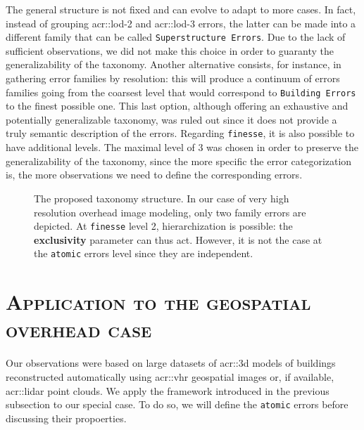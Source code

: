         The general structure is not fixed and can evolve to adapt to more cases.
        In fact, instead of grouping \gls{acr::lod}-2 and \gls{acr::lod}-3 errors, the latter can be made into a different family that can be called \texttt{Superstructure Errors}.
        Due to the lack of sufficient observations, we did not make this choice in order to guaranty the generalizability of the taxonomy.
        Another alternative consists, for instance, in gathering error families by resolution: this will produce a continuum of errors families going from the coarsest level that would correspond to \texttt{Building Errors} to the finest possible one.
        This last option, although offering an exhaustive and potentially generalizable taxonomy, was ruled out since it does not provide a truly semantic description of the errors.
        Regarding \texttt{finesse}, it is also possible to have additional levels.
        The maximal level of 3 was chosen in order to preserve the generalizability of the taxonomy, since the more specific the error categorization is, the more observations we need to define the corresponding errors.

        \begin{figure}[h]
            \begin{center}
                
                \caption{
                    \label{fig::taxonomy} 
                    The proposed taxonomy structure.
                    In our case of very high resolution overhead image modeling, only two family errors are depicted.
                    At \texttt{finesse} level 2, hierarchization is possible: the \textbf{exclusivity} parameter can thus act.
                    However, it is not the case at the \texttt{atomic} errors level since they are independent.
                }
            \end{center}
        \end{figure}

\section{\textsc{Application to the geospatial overhead case}}
    \label{sec::semantic_evaluation::overhead}
    Our observations were based on large datasets of \gls{acr::3d} models of buildings reconstructed automatically using \gls{acr::vhr} geospatial images or, if available, \gls{acr::lidar} point clouds.
    We apply the framework introduced in the previous subsection to our special case.
    To do so, we will define the \texttt{atomic} errors before discussing their propoerties.

